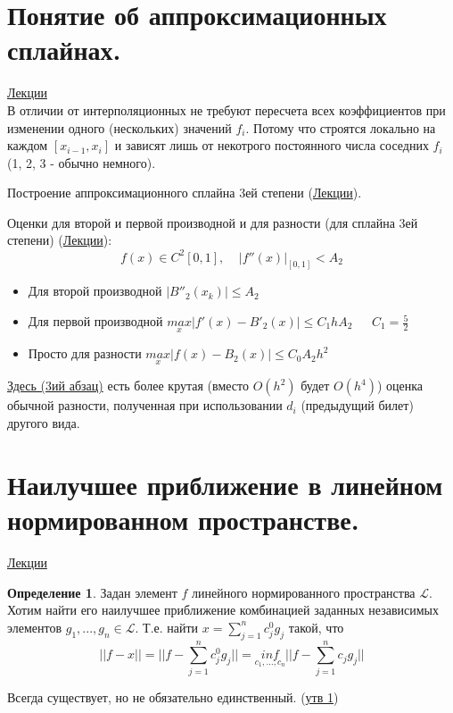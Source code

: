 \documentclass[specialist, subf, href, colorlinks=true, 12pt, times, mtpro, final]{disser}
\theoremstyle{definition}
\newtheorem{defn}{Определение}[section]
\begin{document}
\section {Понятие об аппроксимационных сплайнах.}
    \hyperlink {lects.25}{Лекции}\\
    В отличии от интерполяционных не требуют пересчета всех коэффициентов при изменении одного (нескольких) значений $f_i$. Потому что строятся локально на каждом $[x_{i-1}, x_i]$ и зависят лишь от некотрого постоянного числа соседних $f_i$ (1, 2, 3 - обычно немного).
    
    Построение аппроксимационного сплайна 3ей степени (\hyperlink {lects.25}{Лекции}).
    
    Оценки для второй и первой производной и для разности (для сплайна 3ей степени) (\hyperlink {lects.27}{Лекции}):
    $$
        f(x) \in C^2[0,1], \ \ \ \ \ |f''(x)|_{[0,1]} < A_2
    $$
    \begin{itemize}
        \item Для второй производной $|B''_2(x_k)| \le A_2$
        \item Для первой производной $\underset{x}{max}|f'(x)-B'_2(x)| \le C_1 h A_2 \ \ \ \ \ \  \ C_1 = \frac{5}{2}$
        \item Просто для разности $\underset{x}{max}|f(x)-B_2(x)| \le C_0 A_2 h^2$
            
    \end{itemize}
    \hyperlink {lects.25}{Здесь (3ий абзац)} есть более крутая (вместо $O(h^2)$ будет $O(h^4)$) оценка обычной разности, полученная при использовании $d_i$ (предыдущий билет) другого вида.

\section {Наилучшее приближение в линейном нормированном пространстве.}
    \hyperlink {lects.28}{Лекции}\\
    \begin{defn}
    Задан элемент $f$ линейного нормированного пространства $\mathcal{L}$. Хотим найти его наилучшее приближение комбинацией заданных независимых элементов $g_1, ..., g_n \in \mathcal{L}$. Т.е. найти $x = \sum\limits_{j = 1}^{n}c_j^0g_j$ такой, что
    $$
        ||f - x|| = ||f - \sum\limits_{j = 1}^{n}c_j^0g_j|| = \underset{c_1,...,c_n}{inf} ||f - \sum\limits_{j = 1}^{n}c_jg_j||
    $$
    \end{defn}

    Всегда существует, но не обязательно единственный. (\hyperlink {lects.28}{утв 1})
    
\end{document}
